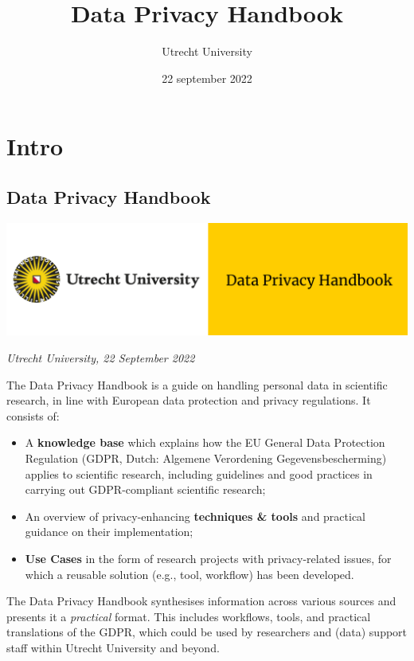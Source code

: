 \documentclass[
]{book}
\title{Data Privacy Handbook}
\author{Utrecht University}
\date{22 september 2022}
\providecommand{\tightlist}{%
  \setlength{\itemsep}{0pt}\setlength{\parskip}{0pt}}
\begin{document}
\maketitle

{
\setcounter{tocdepth}{1}
\tableofcontents
}
\hypertarget{part-intro}{%
\part*{Intro}\label{part-intro}}

\hypertarget{data-privacy-handbook}{%
\chapter*{Data Privacy Handbook}\label{data-privacy-handbook}}

\includegraphics{img/cover-image-dph.png}

\emph{Utrecht University, 22 September 2022}

The Data Privacy Handbook is a guide on handling personal data in scientific
research, in line with European data protection and privacy regulations. It
consists of:

\begin{itemize}
\tightlist
\item
  A \textbf{knowledge base} which explains how the EU General Data Protection
  Regulation (GDPR, Dutch: Algemene Verordening Gegevensbescherming) applies to
  scientific research, including guidelines and good practices in carrying out
  GDPR-compliant scientific research;
\item
  An overview of privacy-enhancing \textbf{techniques \& tools} and practical guidance
  on their implementation;
\item
  \textbf{Use Cases} in the form of research projects with privacy-related issues,
  for which a reusable solution (e.g., tool, workflow) has been developed.
\end{itemize}

The Data Privacy Handbook synthesises information across various sources and
presents it a \emph{practical} format. This includes workflows, tools, and practical
translations of the GDPR, which could be used by researchers and (data) support
staff within Utrecht University and beyond.
\end{document}
